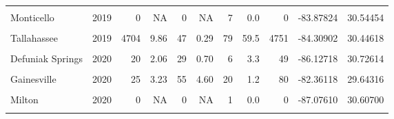 \documentclass{ufdissertation}[overrideChapters] %
\begin{document}
{\begin{table}[!h]
{\begin{tabular}[t]{lrrrrrrrrrr}
\cellcolor{gray!6}{Midway} & \cellcolor{gray!6}{2019} & \cellcolor{gray!6}{0} & \cellcolor{gray!6}{0.00} & \cellcolor{gray!6}{0} & \cellcolor{gray!6}{0.00} & \cellcolor{gray!6}{2} & \cellcolor{gray!6}{0.0} & \cellcolor{gray!6}{0} & \cellcolor{gray!6}{-84.32201} & \cellcolor{gray!6}{30.44610}\\
Monticello & 2019 & 0 & NA & 0 & NA & 7 & 0.0 & 0 & -83.87824 & 30.54454\\
\addlinespace
\cellcolor{gray!6}{Quincy} & \cellcolor{gray!6}{2019} & \cellcolor{gray!6}{0} & \cellcolor{gray!6}{0.00} & \cellcolor{gray!6}{9} & \cellcolor{gray!6}{1.13} & \cellcolor{gray!6}{7} & \cellcolor{gray!6}{0.0} & \cellcolor{gray!6}{9} & \cellcolor{gray!6}{-84.60175} & \cellcolor{gray!6}{30.56986}\\
Tallahassee & 2019 & 4704 & 9.86 & 47 & 0.29 & 79 & 59.5 & 4751 & -84.30902 & 30.44618\\
\cellcolor{gray!6}{Baldwin} & \cellcolor{gray!6}{2020} & \cellcolor{gray!6}{27} & \cellcolor{gray!6}{1.31} & \cellcolor{gray!6}{15} & \cellcolor{gray!6}{1.55} & \cellcolor{gray!6}{4} & \cellcolor{gray!6}{6.8} & \cellcolor{gray!6}{42} & \cellcolor{gray!6}{-81.97352} & \cellcolor{gray!6}{30.30268}\\
Defuniak Springs & 2020 & 20 & 2.06 & 29 & 0.70 & 6 & 3.3 & 49 & -86.12718 & 30.72614\\
\cellcolor{gray!6}{Ferry Pass} & \cellcolor{gray!6}{2020} & \cellcolor{gray!6}{0} & \cellcolor{gray!6}{NA} & \cellcolor{gray!6}{0} & \cellcolor{gray!6}{NA} & \cellcolor{gray!6}{2} & \cellcolor{gray!6}{0.0} & \cellcolor{gray!6}{0} & \cellcolor{gray!6}{-87.21893} & \cellcolor{gray!6}{30.54415}\\
\addlinespace
Gainesville & 2020 & 25 & 3.23 & 55 & 4.60 & 20 & 1.2 & 80 & -82.36118 & 29.64316\\
\cellcolor{gray!6}{Jacksonville} & \cellcolor{gray!6}{2020} & \cellcolor{gray!6}{66} & \cellcolor{gray!6}{1.13} & \cellcolor{gray!6}{41} & \cellcolor{gray!6}{1.67} & \cellcolor{gray!6}{8} & \cellcolor{gray!6}{8.2} & \cellcolor{gray!6}{107} & \cellcolor{gray!6}{-81.68811} & \cellcolor{gray!6}{30.39848}\\
Milton & 2020 & 0 & NA & 0 & NA & 1 & 0.0 & 0 & -87.07610 & 30.60700\\
\cellcolor{gray!6}{Orlando} & \cellcolor{gray!6}{2020} & \cellcolor{gray!6}{0} & \cellcolor{gray!6}{NA} & \cellcolor{gray!6}{0} & \cellcolor{gray!6}{NA} & \cellcolor{gray!6}{4} & \cellcolor{gray!6}{0.0} & \cellcolor{gray!6}{0} & \cellcolor{gray!6}{-81.51605} & \cellcolor{gray!6}{28.50670}\\

\end{tabular}}
\end{table}}
\end{document}

